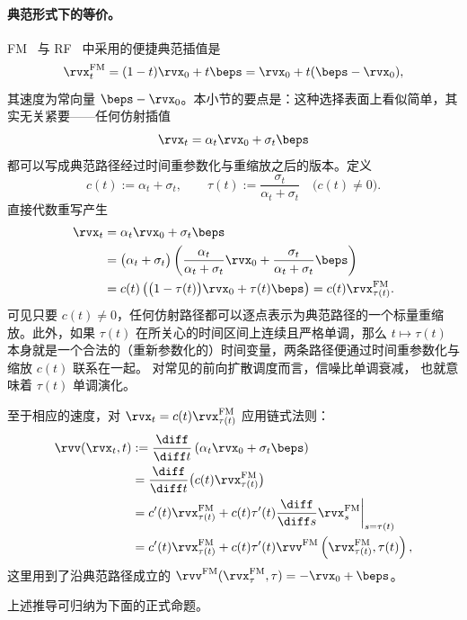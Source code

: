 \paragraph{典范形式下的等价。}
FM~\citep{lipman2022flow} 与 RF~\citep{liu2022rectified} 中采用的便捷典范插值是
\[
\rvx_t^{\mathrm{FM}}=(1-t) \rvx_0+t \beps = \rvx_{0}+t(\beps-\rvx_0),
\]
其速度为常向量 $\beps-\rvx_0$。本小节的要点是：这种选择表面上看似简单，其实无关紧要——任何仿射插值
\[
\rvx_t=\alpha_t \rvx_0+\sigma_t \beps
\]
都可以写成典范路径经过时间重参数化与重缩放之后的版本。定义
\[
c(t):=\alpha_t+\sigma_t,
\qquad
\tau(t):=\frac{\sigma_t}{\alpha_t+\sigma_t}
\quad\big(c(t)\neq 0\big).
\]
直接代数重写产生
\begin{align*}
\rvx_t
&=\alpha_t \rvx_0+\sigma_t \beps
\\
&=\big(\alpha_t+\sigma_t\big) \left(\frac{\alpha_t}{\alpha_t+\sigma_t}\rvx_0+\frac{\sigma_t}{\alpha_t+\sigma_t}\beps\right) \\
&=c(t) \left(\big(1-\tau(t)\big)\rvx_0+\tau(t)\beps\right)
=c(t) \rvx_{\tau(t)}^{\mathrm{FM}}.
\end{align*}
可见只要 $c(t)\neq0$，任何仿射路径都可以逐点表示为典范路径的一个标量重缩放。此外，如果 $\tau(t)$ 在所关心的时间区间上连续且严格单调，那么
$t\mapsto\tau(t)$ 本身就是一个合法的（重新参数化的）时间变量，两条路径便通过时间重参数化与缩放 $c(t)$ 联系在一起。
对常见的前向扩散调度而言，信噪比单调衰减，
也就意味着 $\tau(t)$ 单调演化。

至于相应的速度，对 $\rvx_t=c(t)\rvx_{\tau(t)}^{\mathrm{FM}}$ 应用链式法则：
\begin{align*}
\rvv(\rvx_t,t)
&:= \frac{\diff}{\diff t}\left(\alpha_t\rvx_0 +\sigma_t \beps\right)
\\&=\frac{\diff}{\diff t}\big(c(t)\rvx_{\tau(t)}^{\mathrm{FM}}\big)
\\
&=c'(t) \rvx_{\tau(t)}^{\mathrm{FM}}+c(t) \tau'(t) \frac{\diff}{\diff s}\rvx^{\mathrm{FM}}_{s}\bigg|_{s=\tau(t)} \\
&=c'(t) \rvx_{\tau(t)}^{\mathrm{FM}}+c(t) \tau'(t) \rvv^{\mathrm{FM}} \left(\rvx_{\tau(t)}^{\mathrm{FM}},\tau(t)\right),
\end{align*}
这里用到了沿典范路径成立的 $\rvv^{\mathrm{FM}}(\rvx^{\mathrm{FM}}_{\tau},\tau)=-\rvx_0+\beps$。

上述推导可归纳为下面的正式命题。


